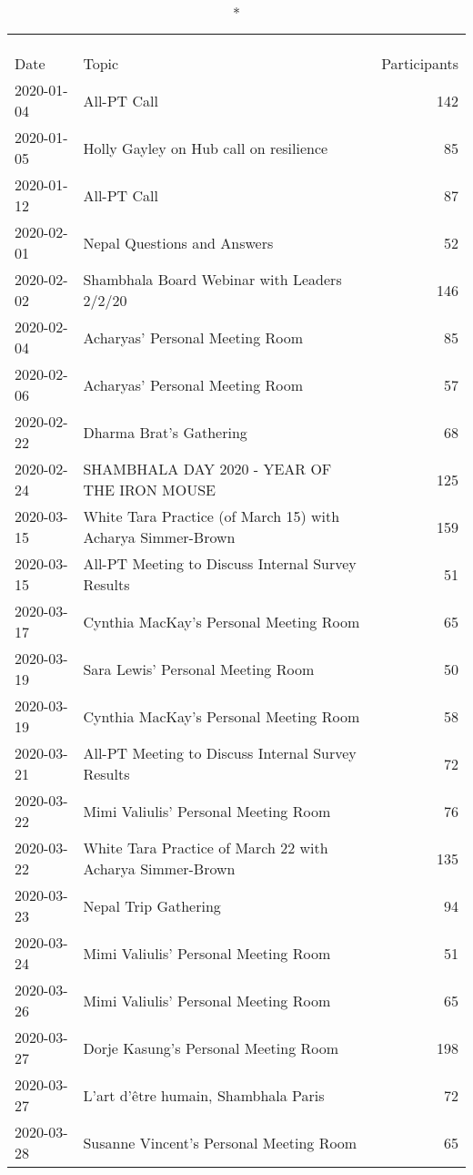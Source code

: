 \documentclass[
]{article}
\begin{document}
\begin{longtable}{llr}
\caption*{
\large Large meetings between 2020-01 and 2020-05\\ 
\small \\ 
} \\ 
\toprule
Date & Topic & Participants \\ 
\midrule
2020-01-04 & All-PT Call & 142 \\ 
2020-01-05 & Holly Gayley on Hub call on resilience & 85 \\ 
2020-01-12 & All-PT Call & 87 \\ 
2020-02-01 & Nepal Questions and Answers & 52 \\ 
2020-02-02 & Shambhala Board Webinar with Leaders 2/2/20 & 146 \\ 
2020-02-04 & Acharyas' Personal Meeting Room & 85 \\ 
2020-02-06 & Acharyas' Personal Meeting Room & 57 \\ 
2020-02-22 & Dharma Brat's Gathering & 68 \\ 
2020-02-24 & SHAMBHALA DAY 2020 - YEAR OF THE IRON MOUSE & 125 \\ 
2020-03-15 & White Tara Practice (of March 15) with Acharya Simmer-Brown & 159 \\ 
2020-03-15 & All-PT Meeting to Discuss Internal Survey Results & 51 \\ 
2020-03-17 & Cynthia MacKay's Personal Meeting Room & 65 \\ 
2020-03-19 & Sara Lewis' Personal Meeting Room & 50 \\ 
2020-03-19 & Cynthia MacKay's Personal Meeting Room & 58 \\ 
2020-03-21 & All-PT Meeting to Discuss Internal Survey Results & 72 \\ 
2020-03-22 & Mimi Valiulis' Personal Meeting Room & 76 \\ 
2020-03-22 & White Tara Practice of March 22 with Acharya Simmer-Brown & 135 \\ 
2020-03-23 & Nepal Trip Gathering & 94 \\ 
2020-03-24 & Mimi Valiulis' Personal Meeting Room & 51 \\ 
2020-03-26 & Mimi Valiulis' Personal Meeting Room & 65 \\ 
2020-03-27 & Dorje Kasung's Personal Meeting Room & 198 \\ 
2020-03-27 & L'art d'être humain, Shambhala Paris & 72 \\ 
2020-03-28 & Susanne Vincent's Personal Meeting Room & 65 \\ 

\end{longtable}
\end{document}
